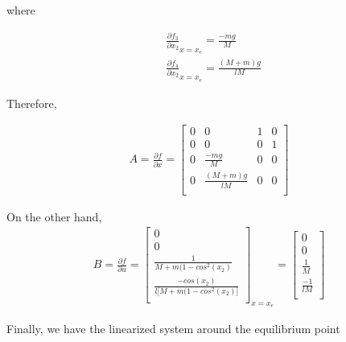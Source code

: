 \documentclass [12pt,letterpaper]{exam}
\begin{document}
where

\begin{align}
& \frac{\partial f_3}{\partial x_2}_{x = x_e} = \frac{-mg}{M} \\
& \frac{\partial f_4}{\partial x_2}_{x = x_e} = \frac{(M + m)g}{lM}
\end{align}

Therefore,

\begin{align}
A = \frac{\partial f}{\partial x} =
\begin{bmatrix}
0 & 0 & 1 & 0 \\
0 & 0 & 0 & 1 \\
0 & \frac{-mg}{M} & 0 & 0 \\
0 & \frac{(M + m)g}{lM} & 0 & 0 \\
\end{bmatrix}
\end{align}

On the other hand,
\begin{align}
B = \frac{\partial f}{\partial u} =
\begin{bmatrix}
0 \\
0 \\
\frac{1}{M + m(1 - cos^{2}(x_2)} \\
\frac{-cos(x_2)}{l\big[M + m(1 - cos^{2}(x_2)\big]} \\
\end{bmatrix}_{x = x_e}
=
\begin{bmatrix}
0 \\
0 \\
\frac{1}{M} \\
\frac{-1}{lM} \\
\end{bmatrix}
\end{align}

Finally, we have the linearized system around the equilibrium point
\end{document}
